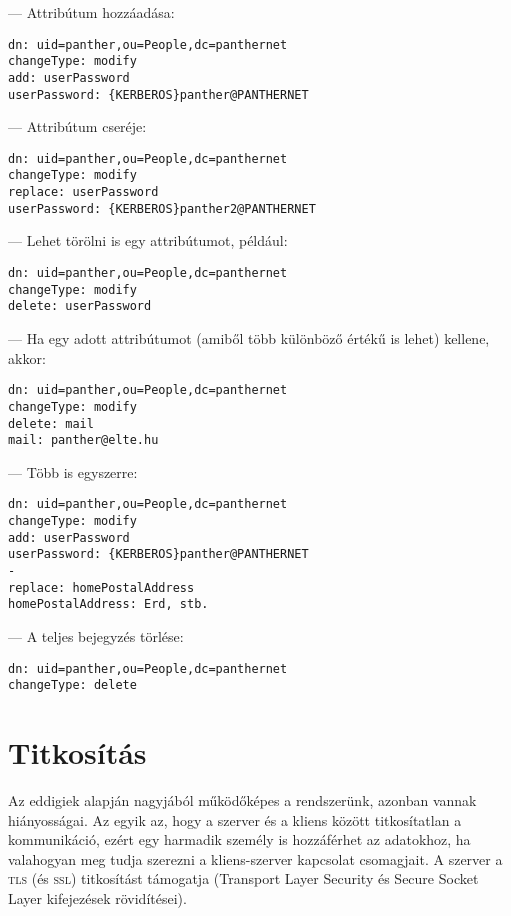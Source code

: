 \noindent  --- Attribútum hozzáadása:

\begin{Verbatim}[frame=single]
dn: uid=panther,ou=People,dc=panthernet
changeType: modify
add: userPassword
userPassword: {KERBEROS}panther@PANTHERNET
\end{Verbatim}

\noindent --- Attribútum cseréje:
\begin{Verbatim}[frame=single]
dn: uid=panther,ou=People,dc=panthernet
changeType: modify
replace: userPassword
userPassword: {KERBEROS}panther2@PANTHERNET
\end{Verbatim}

\noindent --- Lehet törölni is egy attribútumot, például:

\begin{Verbatim}[frame=single]
dn: uid=panther,ou=People,dc=panthernet
changeType: modify
delete: userPassword
\end{Verbatim}


\noindent --- Ha egy adott attribútumot (amiből több különböző értékű is lehet) kellene, akkor:

\begin{Verbatim}[frame=single]
dn: uid=panther,ou=People,dc=panthernet
changeType: modify
delete: mail
mail: panther@elte.hu
\end{Verbatim}

\noindent --- Több is egyszerre:

\begin{Verbatim}[frame=single]
dn: uid=panther,ou=People,dc=panthernet
changeType: modify
add: userPassword
userPassword: {KERBEROS}panther@PANTHERNET
-
replace: homePostalAddress
homePostalAddress: Erd, stb.
\end{Verbatim}

\noindent --- A teljes bejegyzés törlése:
  
\begin{Verbatim}[frame=single]
dn: uid=panther,ou=People,dc=panthernet
changeType: delete
\end{Verbatim}



\section{Titkosítás}

Az eddigiek alapján nagyjából működőképes a rendszerünk, azonban vannak
hiányosságai. Az egyik az, hogy a szerver és a kliens között titkosítatlan a kommunikáció, ezért egy harmadik személy
is hozzáférhet az adatokhoz, ha valahogyan meg tudja szerezni a kliens-szerver kapcsolat csomagjait. A szerver a \textsc{tls}
(és \textsc{ssl}) titkosítást támogatja (Transport Layer Security és Secure Socket Layer kifejezések rövidítései).

